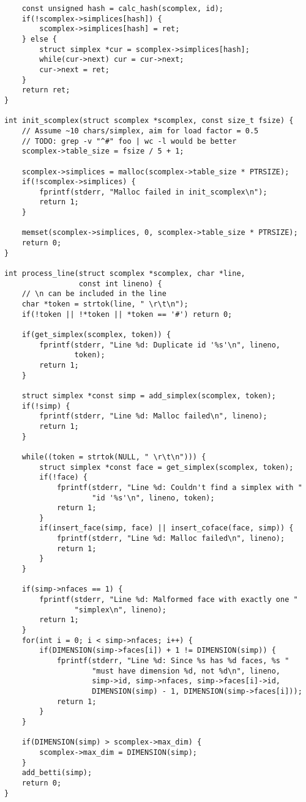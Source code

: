 \documentclass{article}
\begin{document}
\begin{verbatim}
    const unsigned hash = calc_hash(scomplex, id);
    if(!scomplex->simplices[hash]) {
        scomplex->simplices[hash] = ret;
    } else {
        struct simplex *cur = scomplex->simplices[hash];
        while(cur->next) cur = cur->next;
        cur->next = ret;
    }
    return ret;
}

int init_scomplex(struct scomplex *scomplex, const size_t fsize) {
    // Assume ~10 chars/simplex, aim for load factor = 0.5
    // TODO: grep -v "^#" foo | wc -l would be better
    scomplex->table_size = fsize / 5 + 1;

    scomplex->simplices = malloc(scomplex->table_size * PTRSIZE);
    if(!scomplex->simplices) {
        fprintf(stderr, "Malloc failed in init_scomplex\n");
        return 1;
    }

    memset(scomplex->simplices, 0, scomplex->table_size * PTRSIZE);
    return 0;
}

int process_line(struct scomplex *scomplex, char *line,
                 const int lineno) {
    // \n can be included in the line
    char *token = strtok(line, " \r\t\n");
    if(!token || !*token || *token == '#') return 0;

    if(get_simplex(scomplex, token)) {
        fprintf(stderr, "Line %d: Duplicate id '%s'\n", lineno,
                token);
        return 1;
    }

    struct simplex *const simp = add_simplex(scomplex, token);
    if(!simp) {
        fprintf(stderr, "Line %d: Malloc failed\n", lineno);
        return 1;
    }

    while((token = strtok(NULL, " \r\t\n"))) {
        struct simplex *const face = get_simplex(scomplex, token);
        if(!face) {
            fprintf(stderr, "Line %d: Couldn't find a simplex with "
                    "id '%s'\n", lineno, token);
            return 1;
        }
        if(insert_face(simp, face) || insert_coface(face, simp)) {
            fprintf(stderr, "Line %d: Malloc failed\n", lineno);
            return 1;
        }
    }

    if(simp->nfaces == 1) {
        fprintf(stderr, "Line %d: Malformed face with exactly one "
                "simplex\n", lineno);
        return 1;
    }
    for(int i = 0; i < simp->nfaces; i++) {
        if(DIMENSION(simp->faces[i]) + 1 != DIMENSION(simp)) {
            fprintf(stderr, "Line %d: Since %s has %d faces, %s "
                    "must have dimension %d, not %d\n", lineno,
                    simp->id, simp->nfaces, simp->faces[i]->id,
                    DIMENSION(simp) - 1, DIMENSION(simp->faces[i]));
            return 1;
        }
    }

    if(DIMENSION(simp) > scomplex->max_dim) {
        scomplex->max_dim = DIMENSION(simp);
    }
    add_betti(simp);
    return 0;
}
\end{verbatim}
\normalsize
\end{document}
